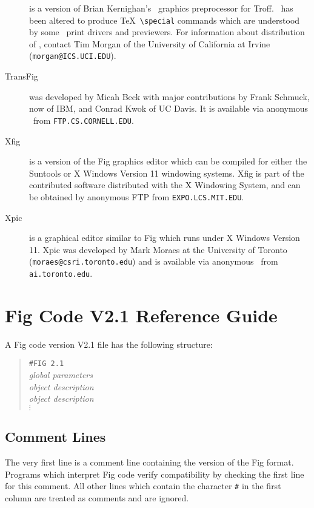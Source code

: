 \begin{description}
\item[\tpic]
	is a version of Brian Kernighan's \PIC\ graphics preprocessor
	for Troff.
\tpic\ has been altered to produce \TeX\ {\verb|\special|} commands which
	are understood by some \DVI\ print drivers and previewers.
For information about distribution of \tpic, contact Tim Morgan of
	the University of California at Irvine ({\tt morgan@ICS.UCI.EDU}).

\item[TransFig]
	was developed by Micah Beck with major contributions
	by Frank Schmuck, now of IBM, and Conrad Kwok of UC Davis.
	It is available via anonymous \FTP\ from {\tt FTP.CS.CORNELL.EDU}.

\item[Xfig]
	is a version of the Fig graphics editor which can be compiled for
	either the Suntools or X Windows Version 11 windowing systems.
Xfig is part of the contributed software distributed with the X Windowing
	System, and can be obtained by anonymous FTP from 
	{\tt EXPO.LCS.MIT.EDU}.

\item[Xpic]
	is a graphical editor similar to Fig which runs under X Windows
	Version 11.
Xpic was developed by Mark Moraes at the University of Toronto
	({\tt moraes@csri.toronto.edu}) and is available via anonymous
	\FTP\ from {\tt ai.toronto.edu}.

\end{description}

\raggedbottom
\pagebreak

\appendix

\section{Fig Code V2.1 Reference Guide}
\label{s:guide}
A Fig code version V2.1 file has the following structure:
%
\begin{quote}
\begin{tabbing}
\verb|#FIG 2.1|			\\
\it global parameters	  	\\
\it object description	 	\\
\it object \= \it description 	\\
\> $\vdots$
\end{tabbing}
\end{quote}
%
\subsection{Comment Lines}
The very first line is a comment line containing the version
	of the Fig format.
Programs which interpret Fig code verify compatibility by checking
	the first line for this comment.
All other lines which contain the character \verb|#| in the first column
	are treated as comments and are ignored.

